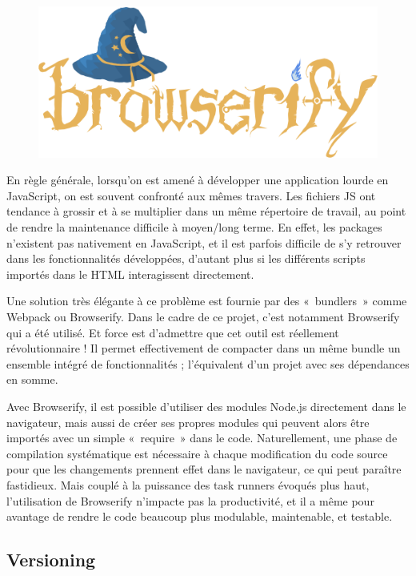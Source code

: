 \documentclass[a4paper,12pt]{article}
\begin{document}
\begin{figure}[!h]
  \begin{center}
    \includegraphics[scale=0.7]{logo-browserify.png}
  \end{center}
\end{figure}

En règle générale, lorsqu'on est amené à développer une application lourde en JavaScript, on est souvent confronté aux mêmes travers. Les fichiers JS ont tendance à grossir et à se multiplier dans un même répertoire de travail, au point de rendre la maintenance difficile à moyen/long terme. En effet, les packages n'existent pas nativement en JavaScript, et il est parfois difficile de s'y retrouver dans les fonctionnalités développées, d'autant plus si les différents scripts importés dans le HTML interagissent directement.

Une solution très élégante à ce problème est fournie par des «~bundlers~» comme Webpack ou Browserify. Dans le cadre de ce projet, c'est notamment Browserify qui a été utilisé. Et force est d'admettre que cet outil est réellement révolutionnaire ! Il permet effectivement de compacter dans un même bundle un ensemble intégré de fonctionnalités ; l'équivalent d'un projet avec ses dépendances en somme.

Avec Browserify, il est possible d'utiliser des modules Node.js directement dans le navigateur, mais aussi de créer ses propres modules qui peuvent alors être importés avec un simple «~require~» dans le code. Naturellement, une phase de compilation systématique est nécessaire à chaque modification du code source pour que les changements prennent effet dans le navigateur, ce qui peut paraître fastidieux. Mais couplé à la puissance des task runners évoqués plus haut, l'utilisation de Browserify n'impacte pas la productivité, et il a même pour avantage de rendre le code beaucoup plus modulable, maintenable, et testable.

\subsection{Versioning}
\end{document}
